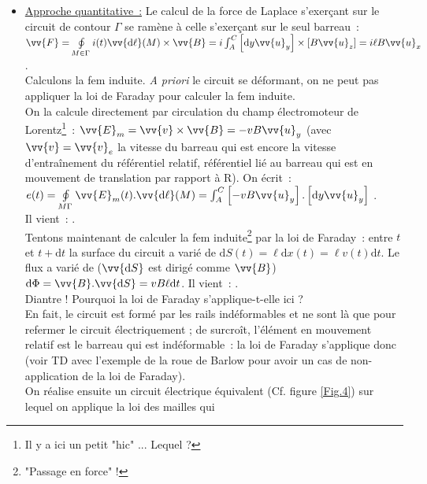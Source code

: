 \documentclass{article}
\let\oldoint\oint
\renewcommand{\oint}{\oldoint\limits}
\renewcommand\overrightarrow{\vv}
\begin{document}
\begin{itemize}
\item \underline{Approche quantitative :} Le calcul de la force de
Laplace s'exerçant sur le circuit de contour $\Gamma$ se ramène à
celle s'exerçant sur le seul barreau : \\
$\overrightarrow{F} = \oint_{M\in
\Gamma}i(t)\overrightarrow{\mathrm{d}\ell}(M)\times \overrightarrow{B} =
i\int_{A}^{C}\left[\mathrm{d}y\overrightarrow{u}_{y}\right] \times
\left[B\overrightarrow{u}_{z}\right] = i\ell B \overrightarrow{u}_{x}$. \\
Calculons la fem induite. \textit{A priori} le circuit se déformant,
on ne peut pas appliquer la loi de Faraday pour calculer la fem
induite. \\
On la calcule directement par circulation du champ électromoteur de
Lorentz\footnote{Il y a ici un petit "hic" ... Lequel ?} :
$\overrightarrow{E}_{m} = \overrightarrow{v}\times
\overrightarrow{B} = -vB\overrightarrow{u}_{y}$ (avec
$\overrightarrow{v}=\overrightarrow{v}_{e}$ la vitesse du barreau
qui est encore la vitesse d'entraînement du référentiel relatif,
référentiel lié au barreau qui est en mouvement de translation par
rapport à R). On écrit : \\
$e(t) = \oint_{M \Gamma}
\overrightarrow{E}_{m}(t).\overrightarrow{\mathrm{d}\ell}(M)=
\int_{A}^{C}\left[-vB\overrightarrow{u}_{y}\right].\left[\mathrm{d}y\overrightarrow{u}_{y}\right]$
. \\
Il vient : . \\
Tentons maintenant de calculer la fem induite\footnote{"Passage en
force" !} par la loi de Faraday : entre $t$ et $t+\mathrm{d}t$ la surface du
circuit a varié de $\mathrm{d}S(t) = \ell \mathrm{d}x(t) = \ell v(t)\mathrm{d}t$. Le flux a
varié de ($\overrightarrow{\mathrm{d}S}$ est dirigé comme
$\overrightarrow{B}$) $\mathrm{d}\Phi =
\overrightarrow{B}.\overrightarrow{\mathrm{d}S} = vB\ell \mathrm{d}t$. Il vient :
. \\
Diantre ! Pourquoi la loi de Faraday s'applique-t-elle ici ?\\
En fait, le circuit est formé par les rails indéformables et ne sont
là que pour refermer le circuit électriquement ; de surcroît,
l'élément en mouvement relatif est le barreau qui est indéformable :
la loi de Faraday s'applique donc (voir TD avec l'exemple de la roue
de Barlow
pour avoir un cas de non-application de la loi de Faraday). \\
On réalise ensuite un circuit électrique équivalent (Cf. figure
\ref{Fig.4}) sur lequel on applique la loi des mailles qui

\end{itemize}
\end{document}
